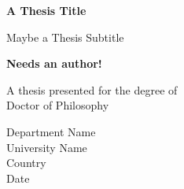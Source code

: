 \begin{titlepage}
\centering

\vspace*{1cm}

\textbf{A Thesis Title}

\vspace{0.5cm}
Maybe a Thesis Subtitle
    
\vspace{1.5cm}

\textbf{Needs an author!}

\vfill
    
A thesis presented for the degree of\\
Doctor of Philosophy
    
\vspace{0.8cm}

    
Department Name\\
University Name\\
Country\\
Date
    
\end{titlepage}